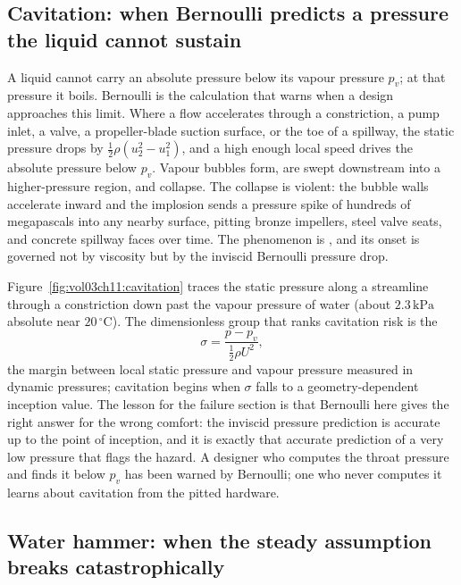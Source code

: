 \subsection{Cavitation: when Bernoulli predicts a pressure the
liquid cannot sustain}

A liquid cannot carry an absolute pressure below its vapour pressure
$p_v$; at that pressure it boils. Bernoulli is the calculation that
warns when a design approaches this limit. Where a flow accelerates
through a constriction, a pump inlet, a valve, a propeller-blade
suction surface, or the toe of a spillway, the static pressure drops
by $\tfrac12\rho(u_2^2 - u_1^2)$, and a high enough local speed drives
the absolute pressure below $p_v$. Vapour bubbles form, are swept
downstream into a higher-pressure region, and collapse. The collapse
is violent: the bubble walls accelerate inward and the implosion sends
a pressure spike of hundreds of megapascals into any nearby surface,
pitting bronze impellers, steel valve seats, and concrete spillway
faces over time. The phenomenon is , and its onset
is governed not by viscosity but by the inviscid Bernoulli pressure
drop.



Figure~\ref{fig:vol03ch11:cavitation} traces the static pressure
along a streamline through a constriction down past the vapour
pressure of water (about $2.3\,\text{kPa}$ absolute near
$20\,^{\circ}\mathrm{C}$). The dimensionless group that ranks
cavitation risk is the 
\[
\sigma = \frac{p - p_v}{\tfrac12\rho U^2},
\]
the margin between local static pressure and vapour pressure measured
in dynamic pressures; cavitation begins when $\sigma$ falls to a
geometry-dependent inception value. The lesson for the failure
section is that Bernoulli here gives the right answer for the wrong
comfort: the inviscid pressure prediction is accurate up to the point
of inception, and it is exactly that accurate prediction of a very low
pressure that flags the hazard. A designer who computes the throat
pressure and finds it below $p_v$ has been warned by Bernoulli; one
who never computes it learns about cavitation from the pitted hardware.

\subsection{Water hammer: when the steady assumption breaks
catastrophically}

